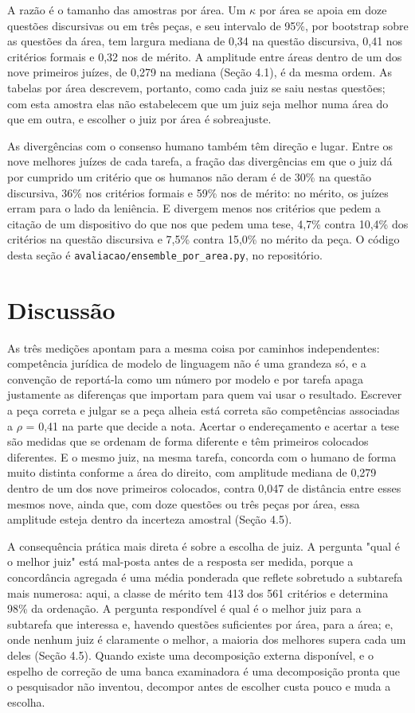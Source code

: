 \documentclass{IOS-Book-Article}
\begin{document}
A razão é o tamanho das amostras por área. Um $\kappa$ por área se apoia em doze questões discursivas ou em três peças, e seu intervalo de 95\%, por bootstrap sobre as questões da área, tem largura mediana de 0,34 na questão discursiva, 0,41 nos critérios formais e 0,32 nos de mérito. A amplitude entre áreas dentro de um dos nove primeiros juízes, de 0,279 na mediana (Seção 4.1), é da mesma ordem. As tabelas por área descrevem, portanto, como cada juiz se saiu nestas questões; com esta amostra elas não estabelecem que um juiz seja melhor numa área do que em outra, e escolher o juiz por área é sobreajuste.

As divergências com o consenso humano também têm direção e lugar. Entre os nove melhores juízes de cada tarefa, a fração das divergências em que o juiz dá por cumprido um critério que os humanos não deram é de 30\% na questão discursiva, 36\% nos critérios formais e 59\% nos de mérito: no mérito, os juízes erram para o lado da leniência. E divergem menos nos critérios que pedem a citação de um dispositivo do que nos que pedem uma tese, 4,7\% contra 10,4\% dos critérios na questão discursiva e 7,5\% contra 15,0\% no mérito da peça. O código desta seção é \texttt{avaliacao/ensemble\_por\_area.py}, no repositório.

\section{Discussão}

As três medições apontam para a mesma coisa por caminhos independentes: competência jurídica de modelo de linguagem não é uma grandeza só, e a convenção de reportá-la como um número por modelo e por tarefa apaga justamente as diferenças que importam para quem vai usar o resultado. Escrever a peça correta e julgar se a peça alheia está correta são competências associadas a $\rho$ = 0,41 na parte que decide a nota. Acertar o endereçamento e acertar a tese são medidas que se ordenam de forma diferente e têm primeiros colocados diferentes. E o mesmo juiz, na mesma tarefa, concorda com o humano de forma muito distinta conforme a área do direito, com amplitude mediana de 0,279 dentro de um dos nove primeiros colocados, contra 0,047 de distância entre esses mesmos nove, ainda que, com doze questões ou três peças por área, essa amplitude esteja dentro da incerteza amostral (Seção 4.5).

A consequência prática mais direta é sobre a escolha de juiz. A pergunta "qual é o melhor juiz" está mal-posta antes de a resposta ser medida, porque a concordância agregada é uma média ponderada que reflete sobretudo a subtarefa mais numerosa: aqui, a classe de mérito tem 413 dos 561 critérios e determina 98\% da ordenação. A pergunta respondível é qual é o melhor juiz para a subtarefa que interessa e, havendo questões suficientes por área, para a área; e, onde nenhum juiz é claramente o melhor, a maioria dos melhores supera cada um deles (Seção 4.5). Quando existe uma decomposição externa disponível, e o espelho de correção de uma banca examinadora é uma decomposição pronta que o pesquisador não inventou, decompor antes de escolher custa pouco e muda a escolha.
\end{document}
